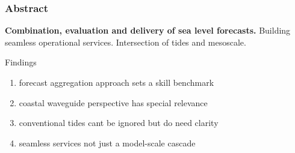 \begin{frame}
\frametitle{Abstract}

\begin{center}
\textbf{Combination, evaluation and delivery of sea level forecasts.}
\vfill{}
Building seamless operational services.
\vfill{}
Intersection of tides and mesoscale.
\end{center}

\vfill{}
Findings
\begin{enumerate}[I]
    \item forecast aggregation approach sets a skill benchmark
    \item coastal waveguide perspective has special relevance
    \item conventional tides cant be ignored but do need clarity
    \item seamless services not just a model-scale cascade
\end{enumerate}

\end{frame}
